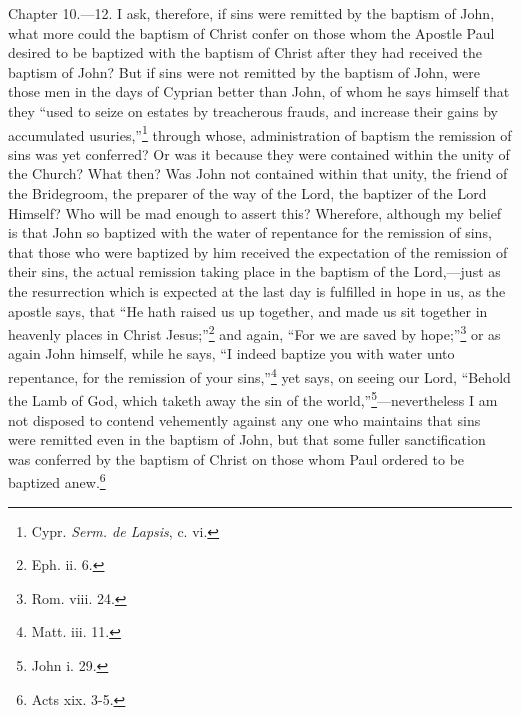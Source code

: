Chapter 10.—12. I ask, therefore, if sins were remitted by the baptism of John, what more could the baptism of Christ confer on those whom the Apostle Paul desired to be baptized with the baptism of Christ after they had received the baptism of John? But if sins were not remitted by the baptism of John, were those men in the days of Cyprian better than John, of whom he says himself that they ``used to seize on estates by treacherous frauds, and increase their gains by accumulated usuries,''\footnote{\par  Cypr. \emph{Serm. de Lapsis}, c. vi.} through whose, administration of baptism the remission of sins was yet conferred? Or was it because they were contained within the unity of the Church? What then? Was John not contained within that unity, the friend of the Bridegroom, the preparer of the way of the Lord, the baptizer of the Lord Himself? Who will be mad enough to assert this? Wherefore, although my belief is that John so baptized with the water of repentance for the remission of sins, that those who were baptized by him received the expectation of the remission of their sins, the actual remission taking place in the baptism of the Lord,—just as the resurrection which is expected at the last day is fulfilled in hope in us, as the apostle says, that ``He hath raised us up together, and made us sit together in heavenly places in Christ Jesus;''\footnote{\par  Eph. ii. 6.} and again, ``For we are saved by hope;''\footnote{\par  Rom. viii. 24.} or as again John himself, while he says, ``I indeed baptize you with water unto repentance, for the remission of your sins,''\footnote{\par  Matt. iii. 11.} yet says, on seeing our Lord, ``Behold the Lamb of God, which taketh away the sin of the world,''\footnote{\par  John i. 29.}—nevertheless I am not disposed to contend vehemently against any one who maintains that sins were remitted even in the baptism of John, but that some fuller sanctification was conferred by the baptism of Christ on those whom Paul ordered to be baptized anew.\footnote{\par  Acts xix. 3-5.}


